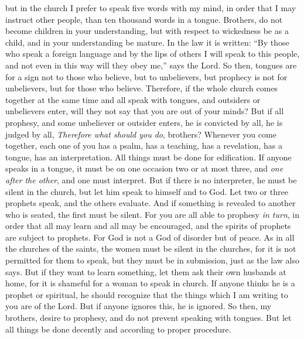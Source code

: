 \begin{biblechapter}
\verse but in the church I prefer to speak five words with my mind, in order that I may instruct other people, than ten thousand words in a tongue.
\verse Brothers, do not become children in your understanding, but with respect to wickedness be as a child, and in your understanding be mature.
\verse In the law it is written: “By those who speak a foreign language 
and by the lips of others 
I will speak to this people, 
and not even in this way will they obey me,”
\verse says the Lord.
\verse So then, tongues are for a sign not to those who believe, but to unbelievers, but prophecy is not for unbelievers, but for those who believe.
\verse Therefore, if the whole church comes together at the same time and all speak with tongues, and outsiders or unbelievers enter, will they not say that you are out of your minds?
\verse But if all prophesy, and some unbeliever or outsider enters, he is convicted by all, he is judged by all,
 \textit{Therefore what should you do}, brothers? Whenever you come together, each one of you has a psalm, has a teaching, has a revelation, has a tongue, has an interpretation. All things must be done for edification.
\verse If anyone speaks in a tongue, it must be on one occasion two or at most three, and \textit{one after the other}, and one must interpret.
\verse But if there is no interpreter, he must be silent in the church, but let him speak to himself and to God.
\verse Let two or three prophets speak, and the others evaluate.
\verse And if something is revealed to another who is seated, the first must be silent.
\verse For you are all able to prophesy \textit{in turn}, in order that all may learn and all may be encouraged,
\verse and the spirits of prophets are subject to prophets.
\verse For God is not a God of disorder but of peace.
\verse As in all the churches of the saints,
\verse the women must be silent in the churches, for it is not permitted for them to speak, but they must be in submission, just as the law also says.
\verse But if they want to learn something, let them ask their own husbands at home, for it is shameful for a woman to speak in church.
\verse If anyone thinks he is a prophet or spiritual, he should recognize that the things which I am writing to you are of the Lord.
\verse But if anyone ignores this, he is ignored.
\verse So then, my brothers, desire to prophesy, and do not prevent speaking with tongues.
\verse But let all things be done decently and according to proper procedure.
\end{biblechapter}

